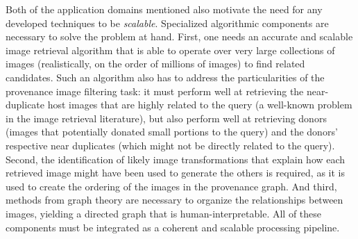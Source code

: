 Both of the application domains mentioned also motivate the need for any developed techniques to be {\em scalable}.
Specialized algorithmic components are necessary to solve the problem at hand.
First, one needs an accurate and scalable image retrieval algorithm that is able to operate over very large collections of images (realistically, on the order of millions of images) to find related candidates.
Such an algorithm also has to address the particularities of the provenance image filtering task: it must perform well at retrieving the near-duplicate host images that are highly related to the query (a well-known problem in the image retrieval literature), but also perform well at retrieving donors (images that potentially donated small portions to the query) and the donors' respective near duplicates (which might not be directly related to the query).
Second, the identification of likely image transformations that explain how each retrieved image might have been used to generate the others is required, as it is used to create the ordering of the images in the provenance graph.
And third, methods from graph theory are necessary to organize the relationships between images, yielding a directed graph that is human-interpretable. %
All of these components must be integrated %
as a coherent and scalable processing pipeline.

